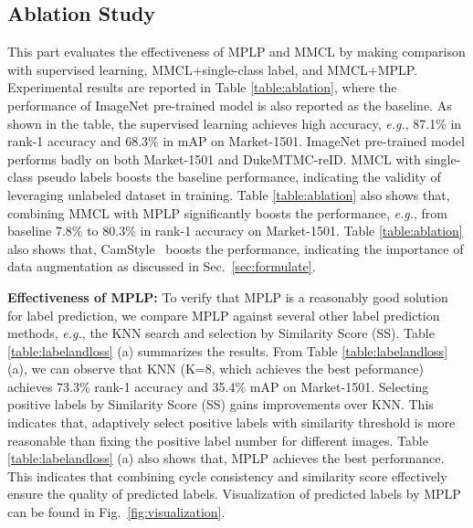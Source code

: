 \documentclass[10pt,twocolumn,letterpaper]{article}
\begin{document}
\vspace{-1mm}
\subsection{Ablation Study}\label{section:ablation}
\vspace{-1mm}
This part evaluates the effectiveness of MPLP and MMCL by making comparison with supervised learning, MMCL+single-class label, and MMCL+MPLP. Experimental results are reported in Table \ref{table:ablation}, where the performance of ImageNet pre-trained model is also reported as the baseline. As shown in the table, the supervised learning achieves high accuracy, \emph{e.g.}, 87.1\% in rank-1 accuracy and 68.3\% in mAP on Market-1501. ImageNet pre-trained model performs badly on both Market-1501 and DukeMTMC-reID. MMCL with single-class pseudo labels boosts the baseline performance, indicating the validity of leveraging unlabeled dataset in training. Table \ref{table:ablation} also shows that, combining MMCL with MPLP significantly boosts the performance, \emph{e.g.}, from baseline 7.8\% to 80.3\% in rank-1 accuracy on Market-1501. Table \ref{table:ablation} also shows that, CamStyle~\cite{zhong2018camera} boosts the performance, indicating the importance of data augmentation as discussed in Sec.~\ref{sec:formulate}.

\textbf{Effectiveness of MPLP:} To verify that MPLP is a reasonably good solution for label prediction, we compare MPLP against several other label prediction methods, \emph{e.g.}, the KNN search and selection by Similarity Score (SS). Table \ref{table:labelandloss} (a) summarizes the results. From Table \ref{table:labelandloss} (a), we can observe that KNN (K=8, which achieves the best peformance) achieves 73.3\% rank-1 accuracy and 35.4\% mAP on Market-1501. Selecting positive labels by Similarity Score (SS) gains improvements over KNN. This indicates that, adaptively select positive labels with similarity threshold is more reasonable than fixing the positive label number for different images. Table \ref{table:labelandloss} (a) also shows that, MPLP achieves the best performance. This indicates that combining cycle consistency and similarity score effectively ensure the quality of predicted labels. Visualization of predicted labels by MPLP can be found in Fig.~\ref{fig:visualization}.
\end{document}
